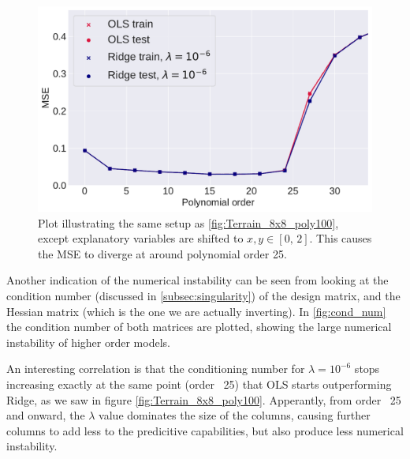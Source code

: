 \documentclass[10pt, twocolumn]{article}
\begin{document}
\begin{figure}[h!]
    \centering
    \includegraphics[scale=0.4]{../figs/OLS_Ridge_0to2divergence.pdf}
    \caption{Plot illustrating the same setup as \cref{fig:Terrain_8x8_poly100}, except explanatory variables are shifted to $x,y\in [0,\, 2]$. This causes the MSE to diverge at around polynomial order 25.}
    \label{fig:0to2divergence}
\end{figure}



Another indication of the numerical instability can be seen from looking at the condition number (discussed in \cref{subsec:singularity}) of the design matrix, and the Hessian matrix (which is the one we are actually inverting). In \cref{fig:cond_num} the condition number of both matrices are plotted, showing the large numerical instability of higher order models.

An interesting correlation is that the conditioning number for $\lambda = 10^{-6}$ stops increasing exactly at the same point (order ~25) that OLS starts outperforming Ridge, as we saw in figure \cref{fig:Terrain_8x8_poly100}. Apperantly, from order ~25 and onward, the $\lambda$ value dominates the size of the columns, causing further columns to add less to the predicitive capabilities, but also produce less numerical instability.
\end{document}
